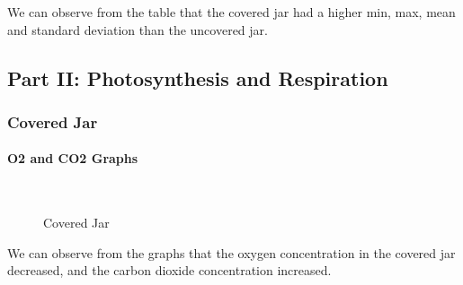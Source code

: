 \documentclass[a4paper, 12pt, english]{article}
\begin{document}
We can observe from the table that the covered jar had a higher min, max, mean
and standard deviation than the uncovered jar.

\subsection{Part II: Photosynthesis and Respiration}
\subsubsection{Covered Jar}
\paragraph{O2 and CO2 Graphs}
\begin{figure}[H]
	\centering
	\\
	\qquad
	\qquad
	\caption{Covered Jar}
	\label{fig:CoveredJar}
\end{figure}

We can observe from the graphs that the oxygen concentration in the covered
jar decreased, and the carbon dioxide concentration increased.
\end{document}
